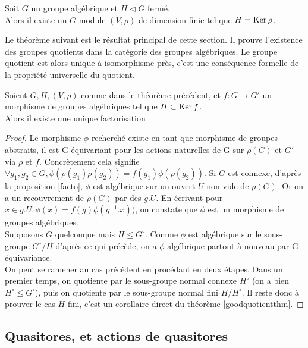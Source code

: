 \begin{thm}
Soit $G$ un groupe algébrique et $H\lhd G$ fermé. \\Alors il existe un $G$-module $(V, \rho)$ de dimension finie tel que $H=\operatorname{Ker}{\rho}$.
\end{thm}
Le théorème suivant est le résultat principal de cette section. Il prouve l'existence des groupes quotients dans la catégorie des groupes algébriques. Le groupe quotient est alors unique à isomorphisme près, c'est une conséquence formelle de la propriété universelle du quotient.
\begin{thm}[Car. 0]\label{groupequotient}
Soient $G, H, (V, \rho)$ comme dans le théorème précédent, et $f:G \rightarrow G'$ un morphisme de groupes algébriques tel que $H\subset \operatorname{Ker} f$.\\
Alors il existe une unique factorisation 	
\end{thm}
\begin{proof}
	Le morphisme $\phi$ recherché existe en tant que morphisme de groupes abstraits, il est G-équivariant pour les actions naturelles de G sur $\rho(G)$ et $G'$ via $\rho$ et $f$. Concrètement cela signifie $\forall g_1, g_2 \in G, \phi(\rho(g_1)\rho(g_2))=f(g_1)\phi(\rho(g_2))$. Si $G$ est connexe, d'après la proposition \ref{facto}, $\phi$ est algébrique sur un ouvert $U$ non-vide de $\rho(G)$. Or on a un recouvrement de $\rho(G)$ par des $g.U$. En écrivant pour $x\in g.U,  \phi(x)=f(g)\phi(g^{-1}.x))$, on constate que $\phi$ est un morphisme de groupes algébriques.
	\\Supposons $G$ quelconque mais $H\leq G^\circ$. Comme $\phi$ est algébrique sur le sous-groupe $G^\circ/H$ d'après ce qui précède, on a $\phi$ algébrique partout à nouveau par G-équivariance.\\
	On peut se ramener au cas précédent en procédant en deux étapes. Dans un premier temps, on quotiente par le sous-groupe normal connexe $H^\circ$ (on a bien $H^\circ\leq G^\circ$), puis on quotiente par le sous-groupe normal fini $H/H^\circ$. Il reste donc à prouver le cas $H$ fini, c'est un corollaire direct du théorème \ref{goodquotientthm}.
	\end{proof}
\subsection{Quasitores, et actions de quasitores}


